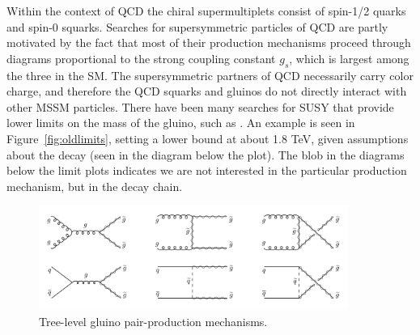 Within the context of QCD the chiral supermultiplets consist of spin-1/2 quarks and spin-0 squarks. Searches for supersymmetric particles of QCD are partly motivated by the fact that most of their production mechanisms proceed through diagrams proportional to the strong coupling constant $g_{s}$, which is largest among the three in the SM. The supersymmetric partners of QCD necessarily carry color charge, and therefore the QCD squarks and gluinos do not directly interact with other MSSM particles. There have been many searches for SUSY that provide lower limits on the mass of the gluino, such as \cite{CMS-SUS-16-033, CMS-SUS-15-002}. An example is seen in Figure~\ref{fig:oldlimits}, setting a lower bound at about 1.8 TeV, given assumptions about the decay (seen in the diagram below the plot). The blob in the diagrams below the limit plots indicates we are not interested in the particular production mechanism, but in the decay chain.

\begin{figure}
\centering
\includegraphics[width=0.9\textwidth]{figs/gluinopair}
\caption{Tree-level gluino pair-production mechanisms.}
\label{fig:gluinopair}
\end{figure}

